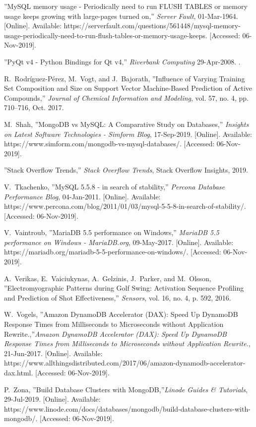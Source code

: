 \documentclass[12pt,journal,compsoc]{IEEEtran}
\begin{document}
\begin{thebibliography}{3}
\bibitem{}
''MySQL memory usage - Periodically need to run FLUSH TABLES or memory usage keeps growing with large-pages turned on,'' \emph{Server Fault}, 01-Mar-1964. [Online]. Available: https://serverfault.com/questions/561448/mysql-memory-usage-periodically-need-to-run-flush-tables-or-memory-usage-keeps. [Accessed: 06-Nov-2019].

\bibitem{}
''PyQt v4 - Python Bindings for Qt v4,'' \emph{Riverbank Computing} 29-Apr-2008. .

\bibitem{}
R.~Rodríguez-Pérez, M.~Vogt, and J.~Bajorath, ''Influence of Varying Training Set Composition and Size on Support Vector Machine-Based Prediction of Active Compounds,'' \emph{Journal of Chemical Information and Modeling}, vol. 57, no. 4, pp. 710–716, Oct. 2017.

\bibitem{}
M.~Shah, ''MongoDB vs MySQL: A Comparative Study on Databases,'' \emph{Insights on Latest Software Technologies - Simform Blog}, 17-Sep-2019. [Online]. Available: https://www.simform.com/mongodb-vs-mysql-databases/. [Accessed: 06-Nov-2019].

\bibitem{}
''Stack Overflow Trends,'' \emph{Stack Overflow Trends}, Stack Overflow Insights, 2019.

\bibitem{}
V.~Tkachenko, ''MySQL 5.5.8 - in search of stability,'' \emph{Percona Database Performance Blog}, 04-Jan-2011. [Online]. Available: https://www.percona.com/blog/2011/01/03/mysql-5-5-8-in-search-of-stability/. [Accessed: 06-Nov-2019].

\bibitem{}
V.~Vaintroub, ''MariaDB 5.5 performance on Windows,'' \emph{MariaDB 5.5 performance on Windows - MariaDB.org}, 09-May-2017. [Online]. Available: https://mariadb.org/mariadb-5-5-performance-on-windows/. [Accessed: 06-Nov-2019].

\bibitem{} 
A.~Verikas, E.~Vaiciukynas, A.~Gelzinis, J.~Parker, and M.~Olsson, ''Electromyographic Patterns during Golf Swing: Activation Sequence Profiling and Prediction of Shot Effectiveness,'' \emph{Sensors}, vol. 16, no. 4, p. 592, 2016.

\bibitem{}
W.~Vogels, ''Amazon DynamoDB Accelerator (DAX): Speed Up DynamoDB Response Times from Milliseconds to Microseconds without Application Rewrite.,''\emph{Amazon DynamoDB Accelerator (DAX): Speed Up DynamoDB Response Times from Milliseconds to Microseconds without Application Rewrite.}, 21-Jun-2017. [Online]. Available: https://www.allthingsdistributed.com/2017/06/amazon-dynamodb-accelerator-dax.html. [Accessed: 06-Nov-2019].

\bibitem{}
P.~Zona, ''Build Database Clusters with MongoDB,''\emph{Linode Guides & Tutorials}, 29-Jul-2019. [Online]. Available: https://www.linode.com/docs/databases/mongodb/build-database-clusters-with-mongodb/. [Accessed: 06-Nov-2019].

\end{thebibliography}
\end{document}
